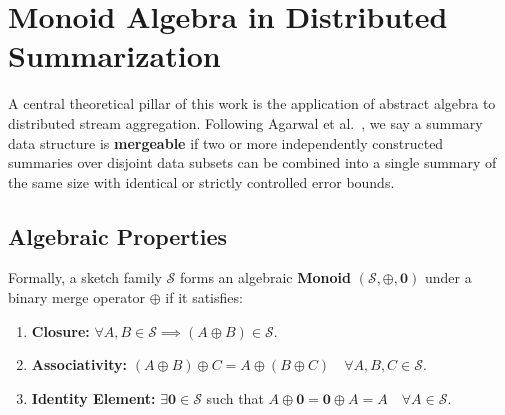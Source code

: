 \begin{table}[htbp]
\centering
{}
\caption{Misra--Gries configuration templates and corresponding detection thresholds.}
\label{tab:mg_templates_ch2}
\end{table}

\section{Monoid Algebra in Distributed Summarization}

A central theoretical pillar of this work is the application of abstract algebra to distributed stream aggregation. Following Agarwal et al.~\cite{agarwal2013mergeable}, we say a summary data structure is \textbf{mergeable} if two or more independently constructed summaries over disjoint data subsets can be combined into a single summary of the same size with identical or strictly controlled error bounds.

\subsection{Algebraic Properties}
Formally, a sketch family $\mathcal{S}$ forms an algebraic \textbf{Monoid} $(\mathcal{S}, \oplus, \mathbf{0})$ under a binary merge operator $\oplus$ if it satisfies:
\begin{enumerate}
 \item \textbf{Closure:} $\forall A, B \in \mathcal{S} \implies (A \oplus B) \in \mathcal{S}$.
 \item \textbf{Associativity:} $(A \oplus B) \oplus C = A \oplus (B \oplus C) \quad \forall A, B, C \in \mathcal{S}$.
 \item \textbf{Identity Element:} $\exists \mathbf{0} \in \mathcal{S}$ such that $A \oplus \mathbf{0} = \mathbf{0} \oplus A = A \quad \forall A \in \mathcal{S}$.
\end{enumerate}


